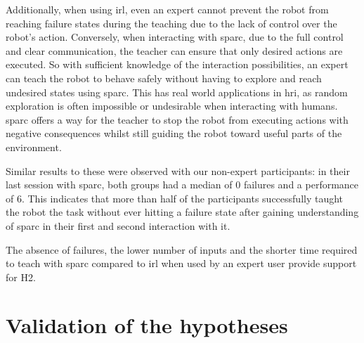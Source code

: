 Additionally, when using \gls{irl}, even an expert cannot prevent the robot from reaching failure states during the teaching due to the lack of control over the robot's action. Conversely, when interacting with \gls{sparc}, due to the full control and clear communication, the teacher can ensure that only desired actions are executed. So with sufficient knowledge of the interaction possibilities, an expert can teach the robot to behave safely without having to explore and reach undesired states using \gls{sparc}. This has real world applications in \gls{hri}, as random exploration is often impossible or undesirable when interacting with humans. \gls{sparc} offers a way for the teacher to stop the robot from executing actions with negative consequences whilst still guiding the robot toward useful parts of the environment.

Similar results to these were observed with our non-expert participants: in their last session with \gls{sparc}, both groups had a median of 0 failures and a performance of 6. This indicates that more than half of the participants successfully taught the robot the task without ever hitting a failure state after gaining understanding of \gls{sparc} in their first and second interaction with it.

The absence of failures, the lower number of inputs and the shorter time required to teach with \gls{sparc} compared to \gls{irl} when used by an expert user provide support for H2.

\section{Validation of the hypotheses}


